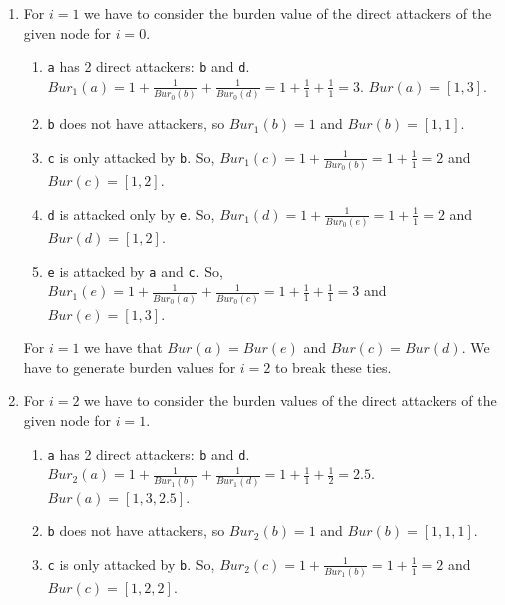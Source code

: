\documentclass{scrbook}
\begin{document}
\begin{enumerate}
    \item 
    For $i=1$ we have to consider the burden value of the direct attackers of the given node for $i=0$.
    \begin{enumerate}[label=\alph*)]
        \item 
        \texttt{a} has 2 direct attackers: \texttt{b} and \texttt{d}.
        $Bur_1(a) = 1 + \frac{1}{Bur_0(b)} + \frac{1}{Bur_0(d)} = 1 + \frac{1}{1} + \frac{1}{1} = 3$. $Bur(a) = [1,3]$.

        \item 
        \texttt{b} does not have attackers, so $Bur_1(b) = 1$ and $Bur(b) = [1,1]$.

        \item 
        \texttt{c} is only attacked by \texttt{b}. So, $Bur_1(c) = 1 + \frac{1}{Bur_0(b)} = 1 + \frac{1}{1} = 2$ and $Bur(c) = [1,2]$.

        \item 
        \texttt{d} is attacked only by \texttt{e}. So, $Bur_1(d) = 1 + \frac{1}{Bur_0(e)} = 1 + \frac{1}{1} = 2$ and $Bur(d) = [1,2]$.

        \item 
        \texttt{e} is attacked by \texttt{a} and \texttt{c}. So, $Bur_1(e) = 1 + \frac{1}{Bur_0(a)} + \frac{1}{Bur_0(c)} = 1 + \frac{1}{1} + \frac{1}{1} = 3$ and $Bur(e) = [1,3]$.
    \end{enumerate}

    For $i=1$ we have that $Bur(a) = Bur(e)$ and $Bur(c) = Bur(d)$. We have to generate burden values for $i=2$ to break these ties.

    \item 
    For $i=2$ we have to consider the burden values of the direct attackers of the given node for $i=1$.
    \begin{enumerate}[label=\alph*)]
        \item 
        \texttt{a} has 2 direct attackers: \texttt{b} and \texttt{d}.
        $Bur_2(a) = 1 + \frac{1}{Bur_1(b)} + \frac{1}{Bur_1(d)} = 1 + \frac{1}{1} + \frac{1}{2} = 2.5$. $Bur(a) = [1,3,2.5]$.

        \item 
        \texttt{b} does not have attackers, so $Bur_2(b) = 1$ and $Bur(b) = [1,1,1]$.

        \item 
        \texttt{c} is only attacked by \texttt{b}. So, $Bur_2(c) = 1 + \frac{1}{Bur_1(b)} = 1 + \frac{1}{1} = 2$ and $Bur(c) = [1,2,2]$.


\end{enumerate}
\end{enumerate}
\end{document}

